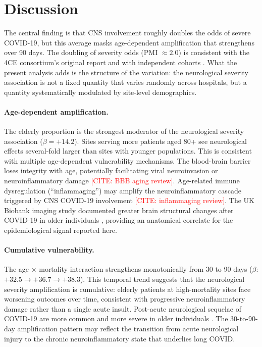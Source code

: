 \documentclass{article}
\begin{document}
\section{Discussion}

The central finding is that CNS involvement roughly doubles the odds of severe COVID-19, but this average masks age-dependent amplification that strengthens over 90 days. The doubling of severity odds (PMI $\approx 2.0$) is consistent with the 4CE consortium's original report \cite{four_ce_neuro2021} and with independent cohorts \cite{frontera2021neuro, mao2020neuro}. What the present analysis adds is the structure of the variation: the neurological severity association is not a fixed quantity that varies randomly across hospitals, but a quantity systematically modulated by site-level demographics.

\paragraph{Age-dependent amplification.} The elderly proportion is the strongest moderator of the neurological severity association ($\beta = +14.2$). Sites serving more patients aged 80+ see neurological effects several-fold larger than sites with younger populations. This is consistent with multiple age-dependent vulnerability mechanisms. The blood-brain barrier loses integrity with age, potentially facilitating viral neuroinvasion or neuroinflammatory damage \textcolor{red}{[CITE: BBB aging review]}. Age-related immune dysregulation (``inflammaging'') may amplify the neuroinflammatory cascade triggered by CNS COVID-19 involvement \textcolor{red}{[CITE: inflammaging review]}. The UK Biobank imaging study documented greater brain structural changes after COVID-19 in older individuals \cite{douaud2022brain}, providing an anatomical correlate for the epidemiological signal reported here.

\paragraph{Cumulative vulnerability.} The age $\times$ mortality interaction strengthens monotonically from 30 to 90 days ($\beta$: $+32.5 \to +36.7 \to +38.3$). This temporal trend suggests that the neurological severity amplification is cumulative: elderly patients at high-mortality sites face worsening outcomes over time, consistent with progressive neuroinflammatory damage rather than a single acute insult. Post-acute neurological sequelae of COVID-19 are more common and more severe in older individuals \cite{nalbandian2021pasc, taquet2021neuro}. The 30-to-90-day amplification pattern may reflect the transition from acute neurological injury to the chronic neuroinflammatory state that underlies long COVID.
\end{document}
